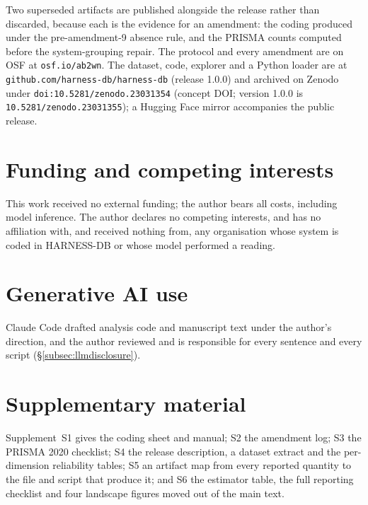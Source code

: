 \documentclass[manuscript,screen,review]{acmart}
\begin{document}
Two superseded artifacts are published alongside the release rather than discarded, because each is the
evidence for an amendment: the coding produced under the pre-amendment-9 absence rule, and the PRISMA
counts computed before the system-grouping repair. The protocol and every amendment are on OSF at
\texttt{osf.io/ab2wn}. The dataset, code, explorer and a Python loader are at
\texttt{github.com/harness-db/harness-db} (release 1.0.0) and archived on Zenodo under
\texttt{doi:10.5281/zenodo.23031354} (concept DOI; version 1.0.0 is \texttt{10.5281/zenodo.23031355});
a Hugging Face mirror accompanies the public release.

\section*{Funding and competing interests}
This work received no external funding; the author bears all costs, including model inference. The
author declares no competing interests, and has no affiliation with, and received nothing from, any
organisation whose system is coded in HARNESS-DB or whose model performed a reading.

\section*{Generative AI use}
Claude Code drafted analysis code and manuscript text under the author's direction, and the author
reviewed and is responsible for every sentence and every script (\S\ref{subsec:llmdisclosure}).

\section*{Supplementary material}
Supplement~S1 gives the coding sheet and manual; S2 the amendment log; S3 the PRISMA 2020 checklist;
S4 the release description, a dataset extract and the per-dimension reliability tables; S5 an artifact
map from every reported quantity to the file and script that produce it; and S6 the estimator table,
the full reporting checklist and four landscape figures moved out of the main text.



\end{document}
